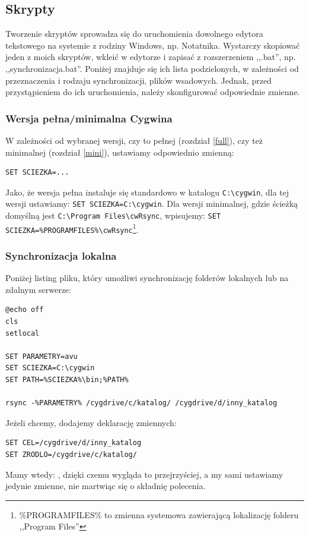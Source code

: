 \subsection{Skrypty}
\label{skrypty}
Tworzenie skryptów sprowadza się do uruchomienia dowolnego edytora tekstowego na systemie z rodziny Windows, np. Notatnika. Wystarczy skopiować jeden z moich skryptów, wkleić w edytorze i zapisać z rozszerzeniem ,,.bat'', np. ,,synchronizacja.bat''. Poniżej znajduje się ich lista podzielonych, w zależności od przeznaczenia i rodzaju synchronizacji, plików wsadowych. Jednak, przed przystąpieniem do ich uruchomienia, należy skonfigurować odpowiednie zmienne.
\subsubsection{Wersja pełna/minimalna Cygwina}
\label{pelmin}
W zależności od wybranej wersji, czy to pełnej (rozdział \ref{full}), czy też minimalnej (rozdział \ref{mini}), ustawiamy odpowiednio zmienną:
\begin{verbatim}
SET SCIEZKA=...
\end{verbatim}
Jako, że wersja pełna instaluje się standardowo w katalogu \verb|C:\cygwin|, dla tej wersji ustawiamy: \verb|SET SCIEZKA=C:\cygwin|. Dla wersji minimalnej, gdzie ścieżką domyślną jest \verb|C:\Program Files\cwRsync|, wpisujemy: \verb|SET SCIEZKA=%PROGRAMFILES%\cwRsync|\footnote{\%PROGRAMFILES\% to zmienna systemowa zawierającą lokalizację folderu ,,Program Files''}.

\subsubsection{Synchronizacja lokalna}
Poniżej listing pliku, który umożliwi synchronizację folderów lokalnych lub na zdalnym serwerze:
\begin{verbatim}
@echo off
cls
setlocal

SET PARAMETRY=avu
SET SCIEZKA=C:\cygwin
SET PATH=%SCIEZKA%\bin;%PATH%

rsync -%PARAMETRY% /cygdrive/c/katalog/ /cygdrive/d/inny_katalog
\end{verbatim}
\noindent
Jeżeli chcemy, dodajemy deklarację zmiennych:
\begin{verbatim}
SET CEL=/cygdrive/d/inny_katalog
SET ZRODLO=/cygdrive/c/katalog/
\end{verbatim}
Mamy wtedy: , dzięki czemu wygląda to przejrzyściej, a my sami ustawiamy jedynie zmienne, nie martwiąc się o składnię polecenia.\\

